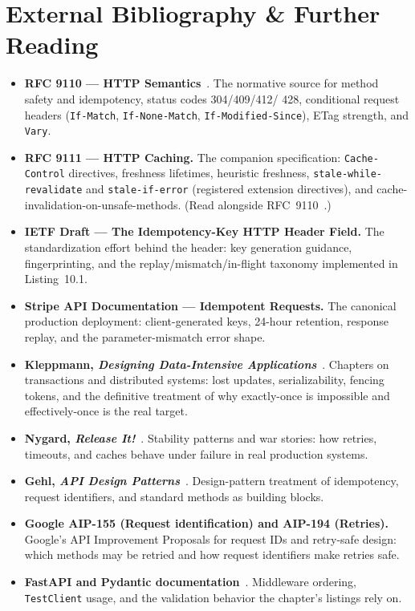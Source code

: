 \section{External Bibliography \& Further Reading}
\label{sec:ch10-bibliography}

\begin{itemize}
  \item \textbf{RFC 9110 --- HTTP Semantics}~\cite{rfc9110}. The normative
        source for method safety and idempotency, status codes 304/409/412/
        428, conditional request headers (\texttt{If-Match},
        \texttt{If-None-Match}, \texttt{If-Modified-Since}), ETag strength,
        and \texttt{Vary}.
  \item \textbf{RFC 9111 --- HTTP Caching.} The companion specification:
        \texttt{Cache-Control} directives, freshness lifetimes, heuristic
        freshness, \texttt{stale-while-revalidate} and
        \texttt{stale-if-error} (registered extension directives), and
        cache-invalidation-on-unsafe-methods. (Read alongside
        RFC~9110~\cite{rfc9110}.)
  \item \textbf{IETF Draft --- The Idempotency-Key HTTP Header Field.}
        The standardization effort behind the header: key generation
        guidance, fingerprinting, and the replay/mismatch/in-flight
        taxonomy implemented in Listing~10.1.
  \item \textbf{Stripe API Documentation --- Idempotent Requests.} The
        canonical production deployment: client-generated keys, 24-hour
        retention, response replay, and the parameter-mismatch error shape.
  \item \textbf{Kleppmann, \emph{Designing Data-Intensive
        Applications}}~\cite{kleppmann2017ddia}. Chapters on transactions
        and distributed systems: lost updates, serializability, fencing
        tokens, and the definitive treatment of why exactly-once is
        impossible and effectively-once is the real target.
  \item \textbf{Nygard, \emph{Release It!}}~\cite{nygard2018releaseit}.
        Stability patterns and war stories: how retries, timeouts, and
        caches behave under failure in real production systems.
  \item \textbf{Gehl, \emph{API Design Patterns}}~\cite{gehl2021apidesign}.
        Design-pattern treatment of idempotency, request identifiers, and
        standard methods as building blocks.
  \item \textbf{Google AIP-155 (Request identification) and AIP-194
        (Retries).} Google's API Improvement Proposals for request IDs and
        retry-safe design: which methods may be retried and how request
        identifiers make retries safe.
  \item \textbf{FastAPI and Pydantic documentation}~\cite{fastapidocs,pydanticdocs}.
        Middleware ordering, \texttt{TestClient} usage, and the validation
        behavior the chapter's listings rely on.
\end{itemize}

